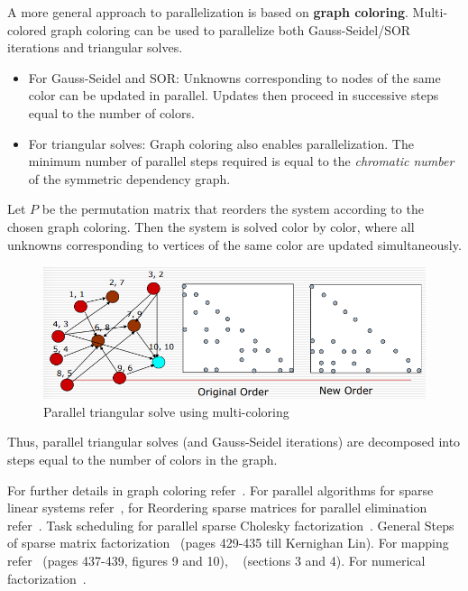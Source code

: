 \documentclass[12pt]{book}
\begin{document}
A more general approach to parallelization is based on \textbf{graph coloring}. Multi-colored graph coloring can be used to parallelize both Gauss-Seidel/SOR iterations and triangular solves.

\begin{itemize}
    \item For Gauss-Seidel and SOR: Unknowns corresponding to nodes of the same color can be updated in parallel. Updates then proceed in successive steps equal to the number of colors.
    \item For triangular solves: Graph coloring also enables parallelization. The minimum number of parallel steps required is equal to the \textit{chromatic number} of the symmetric dependency graph.
\end{itemize}

Let $P$ be the permutation matrix that reorders the system according to the chosen graph coloring. Then the system is solved color by color, where all unknowns corresponding to vertices of the same color are updated simultaneously.

\begin{figure}[ht]
    \centering
    \includegraphics[width=0.75\linewidth]{images/llTSmutlicolor.png}
    \caption{Parallel triangular solve using multi-coloring}
    \label{fig:llTSmutli}
\end{figure}

Thus, parallel triangular solves (and Gauss-Seidel iterations) are decomposed into steps equal to the number of colors in the graph.



For further details in graph coloring refer~\cite{luby1985simple,jones1993parallel,kale1995efficient,gebremedhin2000scalable,gebremedhin2003graph}. For parallel algorithms for sparse linear systems refer~\cite{heath1991parallel}, for Reordering sparse matrices for parallel elimination refer~\cite{liu1989reordering,george1989evolution,gupta1995parallel,raghavan1998efficient,liu1989multifrontal,gupta2002highly}. Task scheduling for parallel sparse Cholesky factorization~\cite{geist1989task}. General Steps of sparse matrix factorization~\cite{heath1984sparse} (pages 429-435 till Kernighan Lin). For mapping refer~\cite{heath1984sparse} (pages 437-439, figures 9  and 10), ~\cite{geist1989task} (sections 3 and 4). For numerical factorization~\cite{heath1984sparse}.
\end{document}
